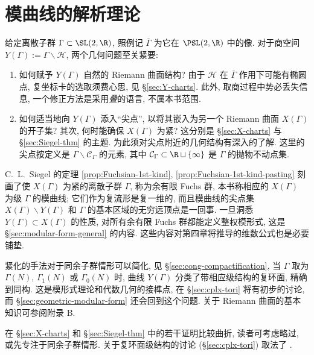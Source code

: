 
\chapter{模曲线的解析理论}
给定离散子群 $\Gamma \subset \SL(2,\R)$, 照例记 $\overline{\Gamma}$ 为它在 $\PSL(2,\R)$ 中的像. 对于商空间 $Y(\Gamma) := \Gamma \backslash \mathcal{H}$, 两个几何问题至关紧要:
\begin{enumerate}
	\item 如何赋予 $Y(\Gamma)$ 自然的 Riemann 曲面结构? 由于 $\mathcal{H}$ 在 $\overline{\Gamma}$ 作用下可能有椭圆点, 复坐标卡的选取须费心思, 见 \S\ref{sec:Y-charts}. 此外, 取商过程中势必丢失信息, 一个修正方法是采用\emph{叠}的语言, 不属本书范围.
	\item 如何适当地向 $Y(\Gamma)$ 添入``尖点'', 以将其嵌入为另一个 Riemann 曲面 $X(\Gamma)$ 的开子集? 其次, 何时能确保 $X(\Gamma)$ 为紧? 这分别是 \S\ref{sec:X-charts} 与 \S\ref{sec:Siegel-thm} 的主题. 为此须对尖点附近的几何结构有深入的了解. 这里的尖点按定义是 $\Gamma \backslash \mathcal{C}_\Gamma$ 的元素, 其中 $\mathcal{C}_\Gamma \subset \R \sqcup \{\infty\}$ 是 $\Gamma$ 的抛物不动点集.
\end{enumerate}

C.\ L.\ Siegel 的定理 \ref{prop:Fuchsian-1st-kind}, \ref{prop:Fuchsian-1st-kind-pasting} 刻画了使 $X(\Gamma)$ 为紧的离散子群 $\Gamma$, 称为余有限 Fuchs 群, 本书称相应的 $X(\Gamma)$ 为级 $\Gamma$ 的模曲线; 它们作为复流形是复一维的, 而且模曲线的尖点集 $X(\Gamma) \smallsetminus Y(\Gamma)$ 和 $\Gamma$ 的基本区域的无穷远顶点是一回事. 一旦洞悉 $Y(\Gamma) \subset X(\Gamma)$ 的性质, 对所有余有限 Fuchs 群都能定义整权模形式, 这是 \S\ref{sec:modular-form-general} 的内容. 这些内容对第四章将推导的维数公式也是必要铺垫.

紧化的手法对于同余子群情形可以简化, 见 \S\ref{sec:cong-compactification}, 当 $\Gamma$ 取为 $\Gamma(N)$, $\Gamma_1(N)$ 或 $\Gamma_0(N)$ 时, 曲线 $Y(\Gamma)$ 分类了带相应级结构的复环面, 精确到同构. 这是模形式理论和代数几何的接榫点, 在 \S\ref{sec:cplx-tori} 将有初步的讨论, 而 \S\ref{sec:geometric-modular-form} 还会回到这个问题. 关于 Riemann 曲面的基本知识可参阅附录 B.

在 \S\ref{sec:X-charts} 和 \S\ref{sec:Siegel-thm} 中的若干证明比较曲折, 读者可考虑略过, 或先专注于同余子群情形. 关于复环面级结构的讨论 (\S\ref{sec:cplx-tori}) 取法了 \cite{Del71}.

